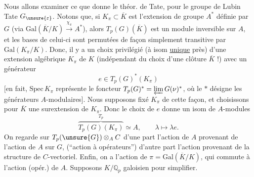 Nous allons examiner  ce que donne le théor. de Tate, pour le groupe de Lubin Tate $G_{\unsure{\varepsilon}}$.
Notons que, si $K_\pi\subset\overline K$ est l'extension  de groupe $A^*$ définie par $G$ (via $\mathrm{Gal}(\overline K/K)\xrightarrow{\chi_\pi}A^*$), alors  $T_p(G)(\overline K)$ est un module inversible sur $A$, et les bases de celui-ci sont permutées de façon simplement transitive par $\mathrm{Gal}(K_\pi/K)$. Donc, il y a un choix privilégié (à isom \uline{unique} près) d'une extension algébrique $K_\pi$ de $K$ (indépendant du choix d'une clôture $\overline K$ !) avec un générateur
\[
e\in T_p(G)^*(K_\pi)
\]
[en fait, $\mathrm{Spec}\,K_\pi$ représente le foncteur $T_p(G)^*=\varprojlim G(\nu)^*$, où le $*$ désigne les générateurs  $A$-modulaires]. Nous supposons fixé $K_\pi$ de cette façon, et choisissons pour $\overline K$ une surextension de $K_\pi$. Donc le choix de $e$ donne un isom de $A$-modules
\[
\overbrace{T_p(G)(K_\pi)}^{T_p}\simeq A,\qquad\lambda\longmapsto\lambda e.
\]
On regarde sur $T_p(\unsure{G})\otimes_A C$ d'une part l'action de $A$ provenant de l'action de $A$ sur $G$, (``action à opérateurs'') d'autre part l'action provenant de la structure de $C$-vectoriel. Enfin, on a l'action de $\pi=\mathrm{Gal}(\overline K/K)$, qui commute à l'action (opér.) de $A$. Supposons $K/\mathbb Q_p$ galoisien pour simplifier.
